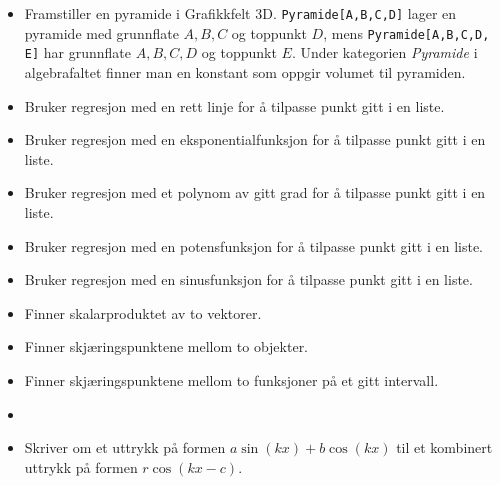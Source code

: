 \begin{itemize}
{	
}

\item {}
{Framstiller en pyramide i Grafikkfelt 3D. {\tt Pyramide[A,B,C,D]} lager en pyramide med grunnflate ${ A, B, C} $ og toppunkt $ D $, mens {\tt Pyramide[A,B,C,D, E]} har grunnflate ${ A, B, C, D }$ og toppunkt $ E $. Under kategorien \textsl{Pyramide} i algebrafaltet finner man en konstant som oppgir volumet til pyramiden.}

\item {}
{Bruker regresjon med en rett linje for å tilpasse punkt gitt i en liste.}

\item {}
{Bruker regresjon med en eksponentialfunksjon for å tilpasse punkt gitt i en liste.}

\item {}
{Bruker regresjon med et polynom av gitt grad for å tilpasse punkt gitt i en liste.}

\item {}
{Bruker regresjon med en potensfunksjon for å tilpasse punkt gitt i en liste.}

\item {}
{Bruker regresjon med en sinusfunksjon for å tilpasse punkt gitt i en liste.	}

\item {} 
{Finner skalarproduktet av to vektorer. \\
}

\item {}
{Finner skjæringspunktene mellom to objekter. 
}

\item {}
{Finner skjæringspunktene mellom to funksjoner på et gitt intervall.}

\item {}

\item {}
{Skriver om et uttrykk på formen $ a\sin (kx) + b\cos (kx) $ til et kombinert uttrykk på formen $ r\cos (kx-c) $.}


\end{itemize}
